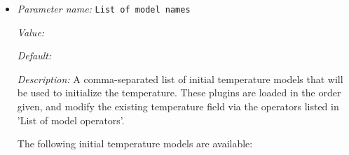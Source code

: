 \begin{itemize}
\item {\it Parameter name:} {\tt List of model names}
\label{parameters:Initial temperature model/List of model names}
\label{parameters:Initial_20temperature_20model/List_20of_20model_20names}


{\it Value:} 


{\it Default:} 


{\it Description:} A comma-separated list of initial temperature models that will be used to initialize the temperature. These plugins are loaded in the order given, and modify the existing temperature field via the operators listed in 'List of model operators'.

The following initial temperature models are available:


\end{itemize}
